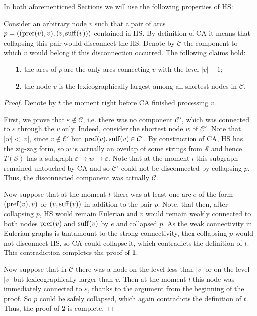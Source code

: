 In both aforementioned Sections we will use the following properties of HS:
\begin{lemma}\label{lemma:property}
    Consider an arbitrary node $v$ such that a pair of arcs $p = ((\operatorname{pref}(v), v), (v, \operatorname{suff}(v)))$ contained in HS. By definition of CA it means that collapsing this pair would disconnect the HS. Denote by $\mathcal{C}$ the component to which $v$ would belong if this disconnection occurred. The following claims hold:
    \begin{itemize}
        \item[\bf 1.] the arcs of $p$ are the only arcs connecting $v$ with the level $|v|-1$;
        \item[\bf 2.] the node $v$ is the lexicographically largest among all shortest nodes in $\mathcal{C}$.
    \end{itemize}    
\end{lemma}
\begin{proof}
    Denote by $t$ the moment right before CA finished processing $v$.
    
    First, we prove that $\varepsilon \notin \mathcal{C}$, i.e. there was no component $\mathcal{C}'$, which was connected to $\varepsilon$ through the $v$ only. Indeed, consider the shortest node $w$ of $\mathcal{C}'$. Note that $|w| < |v|$, since $v \notin \mathcal{C}'$ but $\operatorname{pref}(v), \operatorname{suff}(v) \in \mathcal{C}'$. By construction of CA, HS has the zig-zag form, so $w$ is actually an overlap of some strings from $\mathcal{S}$ and hence $T(\mathcal{S})$ has a subgraph $\varepsilon \to w \to \varepsilon$. Note that at the moment $t$ this subgraph remained untouched by CA and so $\mathcal{C}'$ could not be disconnected by collapsing $p$. Thus, the disconnected component was actually $\mathcal{C}$.
    
    Now suppose that at the moment $t$ there was at least one arc $e$ of the form $(\operatorname{pref}(v), v)$ or $(v, \operatorname{suff}(v))$ in addition to the pair $p$. Note, that then, after collapsing $p$, HS would remain Eulerian and $v$ would remain weakly connected to both nodes $\operatorname{pref}(v)$ and $\operatorname{suff}(v)$ by $e$ and collapsed $p$. As the weak connectivity in Eulerian graphs is tantamount to the strong connectivity, then collapsing $p$ would not disconnect HS, so CA could collapse it, which contradicts the definition of $t$. This contradiction completes the proof of {\bf 1}.
    
    Now suppose that in $\mathcal{C}$ there was a node on the level less than $|v|$ or on the level $|v|$ but lexicographically larger than $v$. Then at the moment $t$ this node was immediately connected to $\varepsilon$, thanks to the argument from the beginning of the proof. So $p$ could be safely collapsed, which again contradicts the definition of $t$. Thus, the proof of {\bf 2} is complete.
\end{proof}
